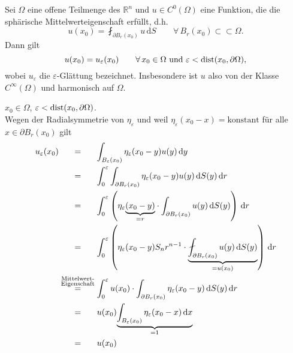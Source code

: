 \begin{satz}
	Sei $\Omega$ eine offene Teilmenge des $\mathbb{R}^n$ und $u \in C^0(\Omega)$ eine Funktion, die die sphärische Mittelwerteigenschaft erfüllt, d.h.
	\begin{equation}
		u(x_0) = \fint_{\partial B_r(x_0)}^{} u\,\mathrm{d}S \qquad \forall\, B_r(x_0) \subset \subset \Omega. 
	\end{equation}
	Dann gilt
	\begin{equation}
		u(x_0) = u_{\varepsilon}(x_0) \qquad \forall\, x_0 \in \Omega \text{ und } \varepsilon < \operatorname{dist}(x_0,\partial \Omega),
	\end{equation}
	wobei $u_{\varepsilon}$ die $\varepsilon$-Glättung bezeichnet. Insbesondere ist $u$ also von der Klasse $C^{\infty}(\Omega)$ und harmonisch auf $\Omega$.
\end{satz}
\begin{beweis}
	$x_0 \in \Omega$, $\varepsilon < \operatorname{dist}(x_0, \partial \Omega)$. \\
	Wegen der Radialsymmetrie von $\eta _{\varepsilon}$ und weil $\eta _{\varepsilon}(x_0-x)= \text{konstant}$ für alle $x \in \partial B_r(x_0)$ gilt
	\begin{align*}
		u_{\varepsilon}(x_0) &\stackrel{\hphantom{\substack{\text{Mittelwert-} \\ \text{Eigenschaft}}}}{=} \int_{B_{\varepsilon}(x_0)}^{}\eta_{\varepsilon}(x_0-y) u(y) 
		\,\mathrm{d}y \\
		&\stackrel{\hphantom{\substack{\text{Mittelwert-} \\ \text{Eigenschaft}}}}{=} \int_{0}^{\varepsilon} \int_{\partial B_r(x_0)}^{} \eta_{\varepsilon}(x_0-y)u(y)
		 \,\mathrm{d}S(y) \,\mathrm{d}r \\
		&\stackrel{\hphantom{\substack{\text{Mittelwert-} \\ \text{Eigenschaft}}}}{=} \int_{0}^{\varepsilon} 
		\left(\eta_{\varepsilon}\underset{=r}{\underbrace{(x_0-y)}} \cdot \int_{\partial B_r(x_0)}^{}u(y) \,\mathrm{d}S(y) \right) \,\mathrm{d}r \\
		&\stackrel{\hphantom{\substack{\text{Mittelwert-} \\ \text{Eigenschaft}}}}{=} \int_{0}^{\varepsilon} \left( \eta_{\varepsilon}(x_0-y)S_nr^{n-1} \cdot 
		\underset{=u(x_0)}{\underbrace{\fint_{\partial B_r(x_0)}^{}u(y) \,\mathrm{d}S(y)}} \right) \,\mathrm{d}r \\
		& \stackrel{\substack{\text{Mittelwert-} \\ \text{Eigenschaft}}}{=} \int_{0}^{\varepsilon}u(x_0) \cdot \int_{\partial B_r(x_0)}^{} \eta_{\varepsilon}(x_0-y)
		\,\mathrm{d}S(y) \,\mathrm{d}r \\
		&\stackrel{\hphantom{\substack{\text{Mittelwert-} \\ \text{Eigenschaft}}}}{=} u(x_0)
		\underset{=1}{\underbrace{\int_{B_{\varepsilon}(x_0)}^{} \eta_{\varepsilon}(x_0-x) \,\mathrm{d}x}} \\
		&\stackrel{\hphantom{\substack{\text{Mittelwert-} \\ \text{Eigenschaft}}}}{=} u(x_0)
	\end{align*}
\end{beweis}

